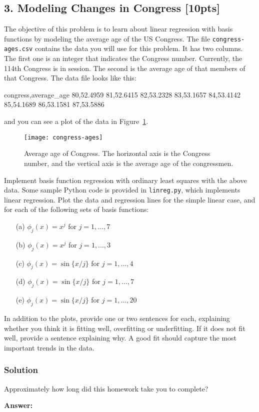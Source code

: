 \documentclass[submit]{harvardml}
\begin{document}
\newpage
\subsection*{3. Modeling Changes in Congress [10pts]}
 The objective of this problem is to learn about linear regression with basis
 functions by modeling the average age of the US Congress. The file
 \verb|congress-ages.csv| contains the data you will use for this problem.  It
 has two columns.  The first one is an integer that indicates the Congress
 number. Currently, the 114th Congress is in session. The second is the average
 age of that members of that Congress.  The data file looks like this:
\begin{csv}
congress,average_age
80,52.4959
81,52.6415
82,53.2328
83,53.1657
84,53.4142
85,54.1689
86,53.1581
87,53.5886
\end{csv}
and you can see a plot of the data in Figure~\ref{fig:congress}.

\begin{figure}[h]
\centering
\texttt{[image: congress-ages]}
\caption{Average age of Congress.  The horizontal axis is the Congress number, and the vertical axis is the average age of the congressmen.}
\label{fig:congress}
\end{figure}

\begin{problem}
Implement basis function regression with ordinary least squares with the above
data. Some sample Python code is provided in \verb|linreg.py|, which implements
linear regression.  Plot the data and regression lines for the simple linear
case, and for each of the following sets of basis functions:
\begin{itemize}
  \item[(a)] $\phi_j(x) = x^j$ for $j=1, \ldots, 7$
  \item[(b)] $\phi_j(x) = x^j$ for $j=1, \ldots, 3$
  \item[(c)] $\phi_j(x) = \sin\{ x / j \}$ for $j=1, \ldots, 4$
  \item[(d)] $\phi_j(x) = \sin\{ x / j \}$ for $j=1, \ldots, 7$
  \item[(e)] $\phi_j(x) = \sin\{ x / j \}$ for $j=1, \ldots, 20$
\end{itemize}
  In addition to the plots, provide one or two sentences for each, explaining
  whether you think it is fitting well, overfitting or underfitting.  If it does
  not fit well, provide a sentence explaining why. A good fit should capture the
  most important trends in the data.
  \end{problem}

\subsubsection*{Solution}











\newpage
\begin{problem}[Calibration, 1pt]
Approximately how long did this homework take you to complete?
\end{problem}
\textbf{Answer:}
\end{document}
